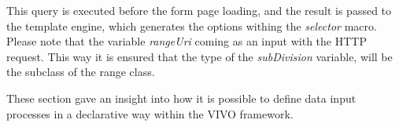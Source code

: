 This query is executed before the form page loading, and the result is passed to the template engine, which generates the options withing the \textit{selector} macro. Please note that the variable \textit{rangeUri} coming as an input with the HTTP request. This way it is ensured that the type of the \textit{subDivision} variable, will be the subclass of the range class.


These section gave an insight into how it is possible to define data input processes in a declarative way within the VIVO framework.





